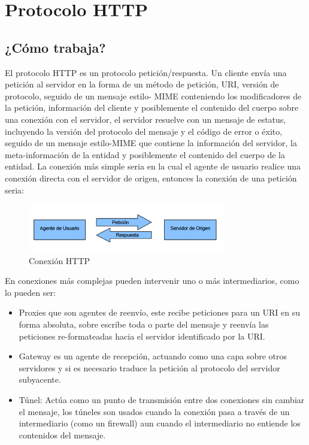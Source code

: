 
\chapter{Protocolo HTTP} %

\label{ch:protocolo_http} %




\section{¿Cómo trabaja?}

El protocolo HTTP es un protocolo petición/respuesta. Un cliente envía una petición al servidor en la forma de un método de petición, URI, versión de protocolo, seguido de un mensaje estilo-
MIME conteniendo los modificadores de la petición, información del cliente y posiblemente el contenido del cuerpo sobre una conexión con el servidor, el servidor resuelve con un mensaje de estatus, incluyendo la versión del protocolo del mensaje y el código de error o éxito, seguido de un mensaje estilo-MIME que contiene la información del servidor, la meta-información de la entidad y posiblemente el contenido del cuerpo de la entidad.
La conexión más simple seria en la cual el agente de usuario realice una conexión directa con el servidor de origen, entonces la conexión de una petición seria:

\begin{figure}[h]
  \centering
    \includegraphics[scale=1]{gfx/conexion_http}
  \caption{Conexión HTTP}
  \label{conexionhttp}
\end{figure}


En conexiones más complejas pueden intervenir uno o más intermediarios, como lo pueden ser:

  \begin{itemize}
     \item Proxies que son agentes de reenvío, este recibe peticiones para un URI en su forma absoluta, sobre escribe toda o parte del mensaje y reenvía las peticiones re-formateadas hacia el servidor identificado por la URI.
     \item Gateway es un agente de recepción, actuando como una capa sobre otros servidores y si es necesario traduce la petición al protocolo del servidor subyacente.
     \item Túnel: Actúa como un punto de transmisión entre dos conexiones sin cambiar el mensaje, los túneles son usados cuando la conexión pasa a través de un intermediario (como un firewall) aun cuando el intermediario no entiende los contenidos del mensaje.
  \end{itemize}



